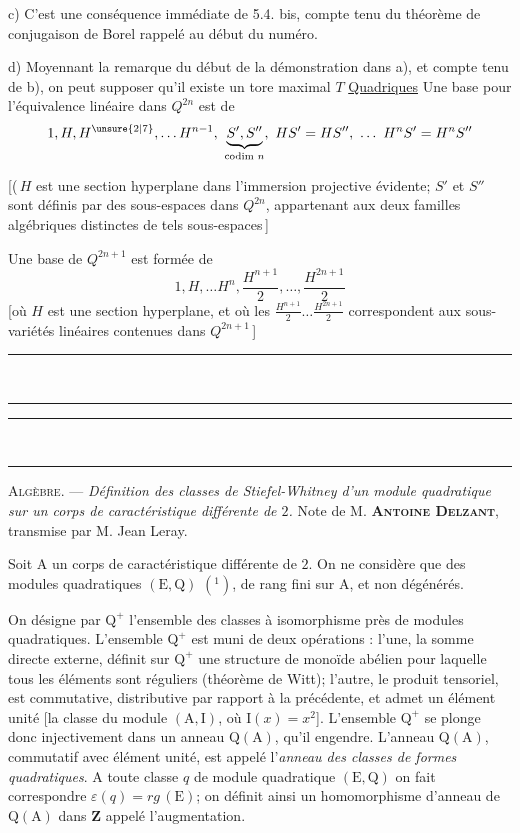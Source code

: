 c) C'est une conséquence immédiate de 5.4. bis, compte tenu du théorème de conjugaison de Borel rappelé au début du numéro.

d) Moyennant la remarque du début de la démonstration dans a), et compte tenu de b), on peut supposer qu'il existe un tore maximal $T$
\uline{Quadriques} \quad Une base pour l'équivalence linéaire dans $Q^{2n}$ est  de
\[
1,H,H^{\unsure{2|7}},\ldots H^{n-1},\
\underbrace{S',S''}_{\text{codim }n},\
HS'=HS'',\ \ldots\ H^{n}S'=H^{n}S''
\]

[(\,$H$ est une section hyperplane dans l'immersion projective évidente; $S'$ et $S''$ sont définis par des sous-espaces   dans $Q^{2n}$, appartenant aux deux familles algébriques distinctes de tels sous-espaces\,]

Une base de $Q^{2n+1}$ est formée de
\[
1,H,\ldots H^{n},\frac{H^{n+1}}{2},\ldots,\frac{H^{2n+1}}{2}
\]
[où $H$ est une section hyperplane, et où les  $\frac{H^{n+1}}{2}\ldots\frac{H^{2n+1}}{2}$ correspondent aux sous-variétés linéaires contenues dans $Q^{2n+1}$\,]

\begin{center}\rule{.23\linewidth}{.4pt}\\[-.65em]\rule{.17\linewidth}{.4pt}\end{center}
\begin{center}\rule{.88\linewidth}{.35pt}\\[-.85em]\rule{.88\linewidth}{.65pt}\end{center}
\textsc{Algèbre}. --- \emph{Définition des classes de Stiefel-Whitney d'un module quadratique sur un corps de caractéristique différente de $2$.} Note de M. \textbf{\textsc{Antoine Delzant}}, transmise par M. Jean Leray.

Soit $\mathrm A$ un corps de caractéristique différente de $2$. On ne considère que des modules quadratiques $(\mathrm E,\mathrm Q)$ $(^{1})$, de rang fini sur $\mathrm A$, et non dégénérés.

On désigne par $\mathrm Q^{+}$ l'ensemble des classes à isomorphisme près de modules quadratiques. L'ensemble $\mathrm Q^{+}$ est muni de deux opérations : l'une, la somme directe externe, définit sur $\mathrm Q^{+}$ une structure de monoïde abélien pour laquelle tous les éléments sont réguliers (théorème de Witt); l'autre, le produit tensoriel, est commutative, distributive par rapport à la précédente, et admet un élément unité [la classe du module $(\mathrm A,\mathrm I)$, où $\mathrm I(x)=x^{2}$]. L'ensemble $\mathrm Q^{+}$ se plonge donc injectivement dans un anneau $\mathrm Q(\mathrm A)$, qu'il engendre. L'anneau $\mathrm Q(\mathrm A)$, commutatif avec élément unité, est appelé l'\emph{anneau des classes de formes quadratiques}. A toute classe $q$ de module quadratique $(\mathrm E,\mathrm Q)$ on fait correspondre $\varepsilon(q)=rg\,(\mathrm E)$; on définit ainsi un homomorphisme d'anneau de $\mathrm Q(\mathrm A)$ dans $\mathbf Z$ appelé l'augmentation.

